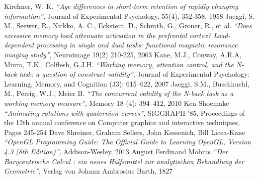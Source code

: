 \begin{thebibliography}{99}
  Kirchner, W. K.
  \emph{``Age differences in short-term retention of rapidly changing information''},
  Journal of Experimental Psychology, 55(4), 352-358,
  1958
  Jaeggi, S. M., Seewer, R., Nirkko, A. C., Eckstein, D., Schroth, G., Groner, R., et al.
  \emph{``Does excessive memory load attenuate activation in the prefrontal cortex? Load-dependent processing in single and dual tasks: functional magnetic resonance imaging study''},
  Neuroimage 19(2) 210-225,
  2003
  Kane, M.J., Conway, A.R.A, Miura, T.K., Colflesh, G.J.H.
  \emph{``Working memory, attention control, and the N-back task: a question of construct validity''},
  Journal of Experimental Psychology: Learning, Memory, and Cognition (33): 615–622,
  2007
  Jaeggi, S.M., Buschkuehl, M., Perrig, W.J., Meier B.
  \emph{``The concurrent validity of the N-back task as a working memory measure''},
  Memory 18 (4): 394–412,
  2010
  Ken Shoemake
  \emph{``Animating rotations with quaternion curves''},
  SIGGRAPH '85,
  Proceedings of the 12th annual conference on Computer graphics and interactive techniques,
  Pages 245-254
  Dave Shreiner, Graham Sellers, John Kessenich, Bill Licea-Kane
  \emph{``OpenGL Programming Guide: The Official Guide to Learning OpenGL, Version 4.3 (8th Edition)''},
  Addison-Wesley,
  2013
  August Ferdinand M\"obius
  \emph{``Der Barycentrische Calcul : ein neues H\"ulfsmittel zur analytischen Behandlung der Geometrie''},
  Verlag von Johann Ambrosius Barth,
  1827
\end{thebibliography}